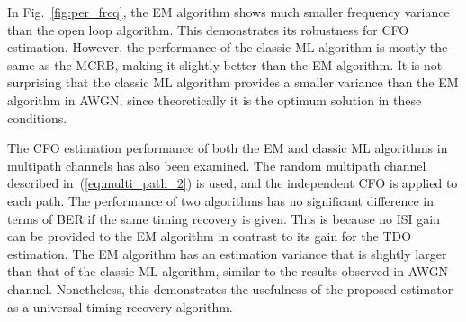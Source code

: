 \documentclass[12pt, draftclsnofoot, onecolumn]{IEEEtran}
\begin{document}
In Fig.~\ref{fig:per_freq}, the EM algorithm shows much smaller frequency variance than the open loop algorithm. 
This demonstrates its robustness for CFO estimation.
However, the performance of the classic ML algorithm is mostly the same as the MCRB, making it slightly better than the EM algorithm.
It is not surprising that the classic ML algorithm provides a smaller variance than the EM algorithm in AWGN, since theoretically it is the optimum solution in these conditions. 

The CFO estimation performance of both the EM and classic ML algorithms in multipath channels has also been examined.
The random multipath channel described in~(\ref{eq:multi_path_2}) is used,
and the independent CFO is applied to each path.
The performance of two algorithms has no significant difference in terms of BER if the same timing recovery is given.
This is because no ISI gain can be provided to the EM algorithm in contrast to its gain for the TDO estimation.
The EM algorithm has an estimation variance that is slightly larger than that of the classic ML algorithm, similar to the results observed in AWGN channel.
Nonetheless, this demonstrates the usefulness of the proposed estimator as a universal timing recovery algorithm.
% 
% 
\end{document}
